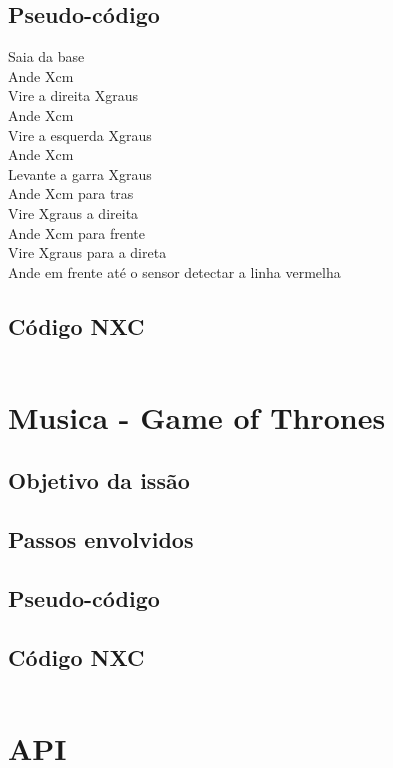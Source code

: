 \documentclass{article}
\begin{document}
	\subsection{Pseudo-código}
		Saia da base\\
		Ande Xcm\\
		Vire a direita Xgraus\\
		Ande Xcm\\
		Vire a esquerda Xgraus\\
		Ande Xcm\\
		Levante a garra Xgraus\\
		Ande Xcm para tras\\
		Vire Xgraus a direita\\
		Ande Xcm para frente\\
		Vire Xgraus para a direta\\
		Ande em frente até o sensor detectar a linha vermelha\\

	\subsection{Código NXC}
		\begin{tcolorbox}[]
			\inputminted{c}{codes/zona_de_seguranca.nxc}
		\end{tcolorbox}

\newpage
\section{Musica - Game of Thrones}
	\subsection{Objetivo da issão}
	\subsection{Passos envolvidos}
	\subsection{Pseudo-código}
	\subsection{Código NXC}
		\begin{tcolorbox}[]
			\inputminted{c}{codes/music_game_of_thrones.nxc}
		\end{tcolorbox}

\newpage
\section{API}
\end{document}
